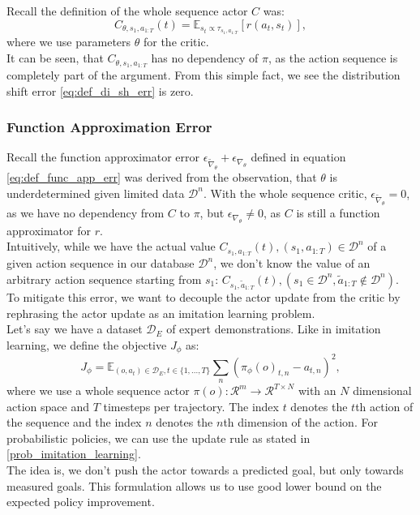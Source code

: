 Recall the definition of the whole sequence actor $C$ was: 
$$C_{\theta, s_1, a_{1:T}}(t) = \mathbb{E}_{s_t \propto \tau_{s_1, a_{1:T}}}\left[r(a_t, s_t)\right],$$
where we use parameters $\theta$ for the critic.\\
It can be seen, that $C_{\theta, s_1, a_{1:T}}$ has no dependency of $\pi$, as the action sequence is completely part of the argument. From this simple fact, we 
see the distribution shift error \ref{eq:def_di_sh_err} is zero. 

\subsubsection{Function Approximation Error}
\label{func_app_error}
Recall the function approximator error $\epsilon_{\widetilde{\nabla}_{\theta}} + \epsilon_{\nabla_{\theta}}$ defined in equation \ref{eq:def_func_app_err} was 
derived from the observation, that $\theta$ is underdetermined 
given limited data $\mathcal{D}^n$. With the whole sequence critic, $\epsilon_{\widetilde{\nabla}_{\theta}} = 0$, as we have no dependency from $C$ to $\pi$, 
but $\epsilon_{\nabla_{\theta}} \neq 0$, as $C$ is still a function approximator for $r$.\\

Intuitively, while we have the actual value $C_{s_1, a_{1:T}}(t), (s_1, a_{1:T}) \in \mathcal{D}^n$ of a given action sequence in our database $\mathcal{D}^n$, 
we don't know the value of an arbitrary action sequence starting from $s_1$: $C_{s_1, \tilde{a}_{1:T}}(t), (s_1 \in \mathcal{D}^n, \tilde{a}_{1:T} \notin \mathcal{D}^n)$. \\
To mitigate this error, we want to decouple the actor update from the critic by rephrasing the actor update as an imitation learning problem. \\
Let's say we have a dataset $\mathcal{D}_E$ of expert demonstrations. Like in imitation learning, we define the objective $J_{\phi}$ as:
\begin{equation}
    \label{eq:ac_obj_1}
    J_{\phi} = \mathbb{E}_{(o, a_{t}) \in \mathcal{D}_E, t \in \{1, ..., T\}}\sum_n \left(\pi_{\phi}(o)_{t, n} - a_{t, n}\right)^2,
\end{equation}
where we use a whole sequence actor 
$\pi(o):\mathcal{R}^m \rightarrow \mathcal{R}^{T \times N}$ with an $N$ dimensional action space and $T$ timesteps per trajectory. The index $t$ denotes the $t$th action of the sequence and the index $n$ denotes the $n$th dimension of 
the action. For probabilistic policies, we can use the update rule as stated in \ref{prob_imitation_learning}.\\ 
The idea is, we don't push the actor towards a predicted goal, 
but only towards measured goals. This formulation allows us to use good lower bound on the expected policy improvement.\\

